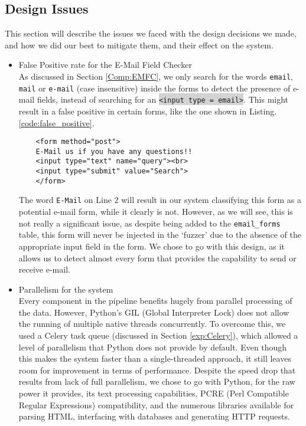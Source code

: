 \subsection[Issues]{Design Issues}
\label{sys:issues}
This section will describe the issues we faced with the design decisions we made, and how we did our best to mitigate them, and their effect on the system.

\begin{itemize}
	\item \label{issues:fpr}False Positive rate for the E-Mail Field Checker\\
	As discussed in Section \ref{Comp:EMFC}, we only search for the words \texttt{email}, \texttt{mail} or \texttt{e-mail} (case insensitive) inside the forms to detect the presence of e-mail fields, instead of searching for an \colorbox{lightgray}{\lstinline{<input type = email>}}. This might result in a false positive in certain forms, like the one shown in Listing. \ref{code:false_positive}.
	
	\begin{lstlisting}
	<form method="post">
	E-Mail us if you have any questions!!
	<input type="text" name="query"><br>
	<input type="submit" value="Search">
	</form>
	\end{lstlisting}
	
	The word \texttt{E-Mail} on Line 2 will result in our system classifying this form as a potential e-mail form, while it clearly is not. However, as we will see, this is not really a significant issue, as despite being added to the \texttt{email\_forms} table, this form will never be injected in the `fuzzer' due to the absence of the appropriate input field in the form. We chose to go with this design, as it allows us to detect almost every form that provides the capability to send or receive e-mail.
	
	\item Parallelism for the system\\
	\label{issues:parallel}
	Every component in the pipeline benefits hugely from parallel processing of the data. However, Python's GIL (Global Interpreter Lock) does not allow the running of multiple native threads concurrently. To overcome this, we used a Celery task queue (discussed in Section \ref{exp:Celery}), which allowed a level of parallelism that Python does not provide by default. Even though this makes the system faster than a single-threaded approach, it still leaves room for improvement in terms of performance. Despite the speed drop that results from lack of full parallelism, we chose to go with Python, for the raw power it provides, its text processing capabilities, PCRE (Perl Compatible Regular Expressions) compatibility, and the numerous libraries available for parsing HTML, interfacing with databases and generating HTTP requests.
	

\end{itemize}
